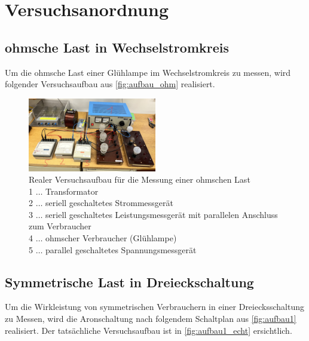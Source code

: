 \documentclass[12pt,english,ngerman]{scrartcl}
\begin{document}

\section{Versuchsanordnung}
\label{sec:versuchsanordnung}

\subsection{ohmsche Last in Wechselstromkreis}

Um die ohmsche Last einer Glühlampe im Wechselstromkreis zu messen, wird
folgender Versuchsaufbau aus \autoref{fig:aufbau_ohm} realisiert.

\begin{figure}[H]
	\begin{center}
		\includegraphics[width = 0.5\textwidth]{./figures/aufbau_ohm.png}
	\end{center}
	\caption[Realer Versuchsaufbau für die Messung einer ohmschen Last] {Realer
		Versuchsaufbau für die Messung einer ohmschen Last \\
		1 \(\dots\) Transformator                          \\
		2 \(\dots\) seriell geschaltetes Strommessgerät    \\
		3 \(\dots\) seriell geschaltetes Leistungsmessgerät mit parallelen Anschluss
		zum Verbraucher                                    \\
		4 \(\dots\) ohmscher Verbraucher (Glühlampe)       \\
		5 \(\dots\) parallel geschaltetes Spannungsmessgerät
	}\label{fig:aufbau_ohm}
\end{figure}

\subsection{Symmetrische Last in Dreieckschaltung}

Um die Wirkleistung von symmetrischen Verbrauchern in einer Dreiecksschaltung
zu Messen, wird die Aronschaltung nach folgendem Schaltplan aus
\autoref{fig:aufbau1} realisiert. Der tatsächliche Versuchsaufbau ist in
\autoref{fig:aufbau1_echt} ersichtlich.
\end{document}
